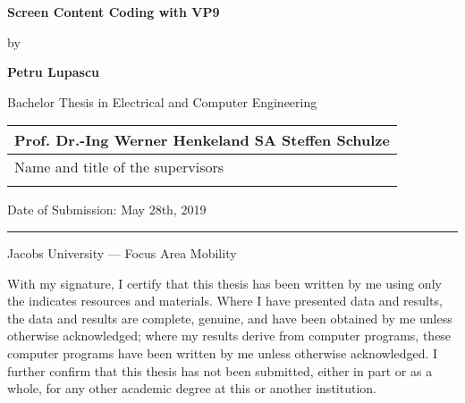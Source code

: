 \documentclass[a4paper,11pt,oneside]{article}
\newcommand{\myname}{Petru Lupascu}
\newcommand{\mytitle}{Screen Content Coding with VP9}
\newcommand{\mysupervisor}{Prof. Dr.-Ing Werner Henkel}
\newcommand{\myssupervisor}{SA Steffen Schulze}
\begin{document}

  \thispagestyle{empty}

  \begin{flushright}
  \end{flushright}
  \vspace{20mm}
  \begin{center}
    \huge
    \textbf{\mytitle}
  \end{center}
  \vspace*{4mm}
  \begin{center}
   \Large by
  \end{center}
  \vspace*{4mm}
  \begin{center}
    \Large
    \textbf{\myname}
  \end{center}
  \vspace*{20mm}
  \begin{center}
    \large
    Bachelor Thesis in Electrical and Computer Engineering
  \end{center}
  \vfill
  \begin{flushright}
    \large
    \begin{tabular}{l}
      \mysupervisor and \myssupervisor \\
      \hline
      Name and title of the supervisors \\
      \\
    \end{tabular}
  \end{flushright}
  \vspace*{8mm}
  \begin{flushleft}
    \large
    Date of Submission: May 28th, 2019 \\
    \rule{\textwidth}{1pt}
  \end{flushleft}
  \begin{center}
    \Large Jacobs University --- Focus Area Mobility
  \end{center}
  
  \iffalse

  \newpage
  \thispagestyle{empty}

  With my signature, I certify that this thesis has been written by me
  using only the indicates resources and materials. Where I have
  presented data and results, the data and results are complete,
  genuine, and have been obtained by me unless otherwise acknowledged;
  where my results derive from computer programs, these computer
  programs have been written by me unless otherwise acknowledged. I
  further confirm that this thesis has not been submitted, either in
  part or as a whole, for any other academic degree at this or another
  institution.
\end{document}
